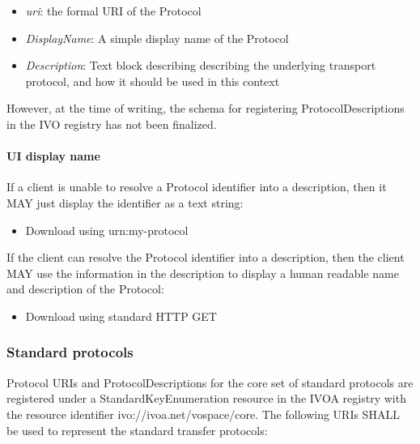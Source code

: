 \documentclass[11pt,a4paper]{ivoa}
\begin{document}
\begin{itemize}
    \item \emph{uri}: the formal URI of the Protocol
    \item \emph{DisplayName}: A simple display name of the Protocol
    \item \emph{Description}: Text block describing describing the underlying transport protocol, and how it should be used in this context
\end{itemize}

However, at the time of writing, the schema for registering ProtocolDescriptions in the IVO registry has not been finalized.

\paragraph{UI display name}

If a client is unable to resolve a Protocol identifier into a description, then it MAY just display the identifier as a text string:

\begin{itemize}
    \item Download using urn:my-protocol
\end{itemize}

If the client can resolve the Protocol identifier into a description, then the client MAY use the information in the description to display a human readable name and description of the Protocol:

\begin{itemize}
    \item Download using standard HTTP GET
\end{itemize}

\subsubsection{Standard protocols}
\label{subsubsec:standard protocols}
Protocol URIs and ProtocolDescriptions for the core set of standard protocols are registered under a StandardKeyEnumeration resource \citep{std:STDREGEXT} in the IVOA registry with the resource identifier ivo://ivoa.net/vospace/core. The following URIs SHALL be used to represent the standard transfer protocols:
\end{document}
